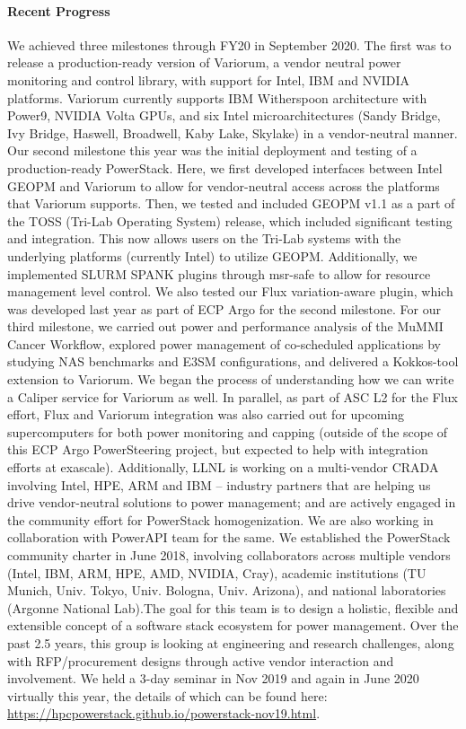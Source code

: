 \paragraph{Recent Progress}
We achieved three milestones through FY20 in September 2020. The first was to release a production-ready version of Variorum, a vendor neutral power monitoring and control library, with support for Intel, IBM and NVIDIA platforms. Variorum currently supports IBM Witherspoon architecture with Power9, NVIDIA Volta GPUs, and six Intel microarchitectures (Sandy Bridge, Ivy Bridge, Haswell, Broadwell, Kaby Lake, Skylake) in a vendor-neutral manner. Our second milestone this year was the initial deployment and testing of a production-ready PowerStack. Here, we first developed interfaces between Intel GEOPM and Variorum to allow for vendor-neutral access across the platforms that Variorum supports. Then, we tested and included GEOPM v1.1 as a part of the TOSS (Tri-Lab Operating System) release, which included significant testing and integration. This now allows users on the Tri-Lab systems with the underlying platforms (currently Intel) to utilize GEOPM. Additionally, we implemented SLURM SPANK plugins through msr-safe to allow for resource management level control.  We also tested our Flux variation-aware plugin, which was developed last year as part of ECP Argo for the second milestone.  For our third milestone, we carried out power and performance analysis of the MuMMI Cancer Workflow, explored power management of co-scheduled applications by studying NAS benchmarks and E3SM configurations, and delivered a Kokkos-tool extension to Variorum. We began the process of understanding how we can write a Caliper service for Variorum as well. 
In parallel, as part of ASC L2 for the Flux effort, Flux and Variorum integration was also carried out for upcoming supercomputers for both power monitoring and capping (outside of the scope of this ECP Argo PowerSteering project, but expected to help with integration efforts at exascale).
Additionally, LLNL is working on a multi-vendor CRADA involving Intel, HPE, ARM and IBM -- industry partners that are helping us drive vendor-neutral solutions to power management; and are actively engaged in the community effort for PowerStack homogenization. We are also working in collaboration with PowerAPI team for the same. We established the PowerStack community charter in June 2018, involving collaborators across multiple vendors (Intel, IBM, ARM, HPE, AMD, NVIDIA, Cray), academic institutions (TU Munich, Univ. Tokyo, Univ. Bologna, Univ. Arizona), and national laboratories (Argonne National Lab).The goal for this team is to design a holistic, flexible and extensible concept of a software stack ecosystem for power management. Over the past 2.5 years, this group is looking at engineering and research challenges, along with RFP/procurement designs through active vendor interaction and involvement. We held a 3-day seminar in Nov 2019 and again in June 2020 virtually this year, the details of which can be found here: \url{https://hpcpowerstack.github.io/powerstack-nov19.html}. 

